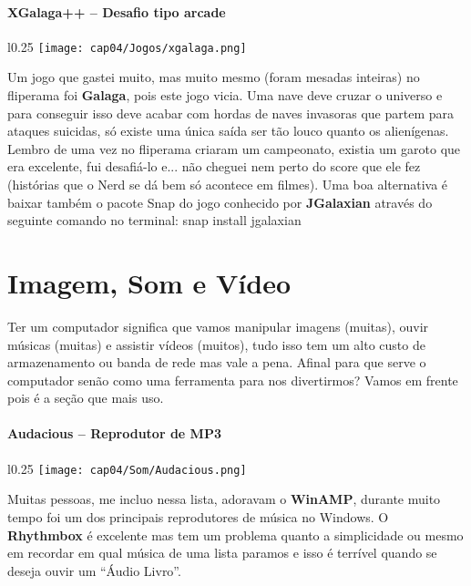 \paragraph{XGalaga++ – Desafio tipo arcade}
\begin{minipage}{\linewidth}
 \vspace{5pt}
 \begin{wrapfigure}{l}{0.25\textwidth}
  \vspace{-\baselineskip}
  \texttt{[image: cap04/Jogos/xgalaga.png]} 
 \end{wrapfigure}
 Um jogo que gastei muito, mas muito mesmo (foram mesadas inteiras) no fliperama foi \textbf{Galaga}, pois este jogo vicia. Uma nave deve cruzar o universo e para conseguir isso deve acabar com hordas de naves invasoras que partem para ataques suicidas, só existe uma única saída ser tão louco quanto os alienígenas. Lembro de uma vez no fliperama criaram um campeonato, existia um garoto que era excelente, fui desafiá-lo e... não cheguei nem perto do score que ele fez (histórias que o Nerd se dá bem só acontece em filmes). Uma boa alternativa é baixar também o pacote Snap do jogo conhecido por \textbf{JGalaxian} através do seguinte comando no terminal: snap install jgalaxian
\end{minipage}

\section{Imagem, Som e Vídeo}
Ter um computador significa que vamos manipular imagens (muitas), ouvir músicas (muitas) e assistir vídeos (muitos), tudo isso tem um alto custo de armazenamento ou banda de rede mas vale a pena. Afinal para que serve o computador senão como uma ferramenta para nos divertirmos? Vamos em frente pois é a seção que mais uso.

\paragraph{Audacious – Reprodutor de MP3}
\begin{minipage}{\linewidth}
 \vspace{5pt}
 \begin{wrapfigure}{l}{0.25\textwidth}
  \vspace{-\baselineskip}
  \texttt{[image: cap04/Som/Audacious.png]} 
 \end{wrapfigure}
 Muitas pessoas, me incluo nessa lista, adoravam o \textbf{WinAMP}, durante muito tempo foi um dos principais reprodutores de música no Windows. O \textbf{Rhythmbox} é excelente mas tem um problema quanto a simplicidade ou mesmo em recordar em qual música de uma lista paramos e isso é terrível quando se deseja ouvir um ``Áudio Livro''.
\end{minipage}

